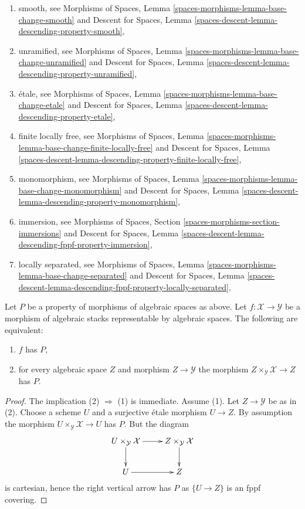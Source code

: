 \begin{enumerate}
\item smooth, see
Morphisms of Spaces,
Lemma \ref{spaces-morphisms-lemma-base-change-smooth}
and
Descent for Spaces,
Lemma \ref{spaces-descent-lemma-descending-property-smooth},
\item unramified, see
Morphisms of Spaces,
Lemma \ref{spaces-morphisms-lemma-base-change-unramified}
and
Descent for Spaces,
Lemma \ref{spaces-descent-lemma-descending-property-unramified},
\item \'etale, see
Morphisms of Spaces,
Lemma \ref{spaces-morphisms-lemma-base-change-etale}
and
Descent for Spaces,
Lemma \ref{spaces-descent-lemma-descending-property-etale},
\item finite locally free, see
Morphisms of Spaces,
Lemma \ref{spaces-morphisms-lemma-base-change-finite-locally-free}
and
Descent for Spaces,
Lemma \ref{spaces-descent-lemma-descending-property-finite-locally-free},
\item monomorphism, see
Morphisms of Spaces,
Lemma \ref{spaces-morphisms-lemma-base-change-monomorphism}
and
Descent for Spaces,
Lemma \ref{spaces-descent-lemma-descending-property-monomorphism},
\item immersion, see
Morphisms of Spaces, Section \ref{spaces-morphisms-section-immersions}
and
Descent for Spaces,
Lemma \ref{spaces-descent-lemma-descending-fppf-property-immersion},
\item locally separated, see
Morphisms of Spaces,
Lemma \ref{spaces-morphisms-lemma-base-change-separated}
and
Descent for Spaces,
Lemma \ref{spaces-descent-lemma-descending-fppf-property-locally-separated},
\end{enumerate}

\begin{lemma}
\label{lemma-property-spaces-too}
Let $P$ be a property of morphisms of algebraic spaces as above.
Let $f : \mathcal{X} \to \mathcal{Y}$ be a morphism of algebraic stacks
representable by algebraic spaces. The following are equivalent:
\begin{enumerate}
\item $f$ has $P$,
\item for every algebraic space $Z$ and morphism $Z \to \mathcal{Y}$
the morphism $Z \times_{\mathcal{Y}} \mathcal{X} \to Z$ has $P$.
\end{enumerate}
\end{lemma}

\begin{proof}
The implication (2) $\Rightarrow$ (1) is immediate. Assume (1).
Let $Z \to \mathcal{Y}$ be as in (2). Choose a scheme $U$ and a
surjective \'etale morphism $U \to Z$. By assumption the morphism
$U \times_{\mathcal{Y}} \mathcal{X} \to U$ has $P$. But the diagram
$$
\xymatrix{
U \times_{\mathcal{Y}} \mathcal{X} \ar[d] \ar[r] &
Z \times_{\mathcal{Y}} \mathcal{X} \ar[d] \\
U \ar[r] & Z
}
$$
is cartesian, hence the right vertical arrow has $P$ as
$\{U \to Z\}$ is an fppf covering.
\end{proof}

